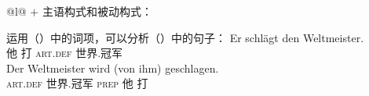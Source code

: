 \ex
\label{ex-schlagen-passive}
\begin{tabular}[t]{@{}l@{}}
 $+$ 主语构式和被动构式：\\
\end{tabular}
\zl
运用（）中的词项，可以分析（）中的句子：
\eal
\label{ex-cxg-weltmeister}
\ex 
\gll Er schlägt den Weltmeister.\\
	 他 打 \textsc{art}.\textsc{def} 世界.冠军\\
\ex 
\gll Der Weltmeister wird (von ihm) geschlagen.\\
     \textsc{art}.\textsc{def} 世界.冠军 \passiveprs{} \textsc{prep} 他 打\\
\zl

